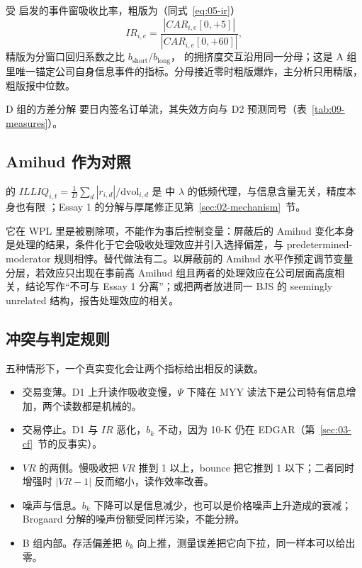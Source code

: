 \documentclass[a4paper,11pt]{ctexart}
\begin{document}
受 \citet{dellavignapollet2009} 启发的事件窗吸收比率，粗版为（同式~\eqref{eq:05-ir}）
\begin{equation}\label{eq:09-ir}
IR_{i,e} = \frac{|CAR_{i,e}[0,+5]|}{|CAR_{i,e}[0,+60]|},
\end{equation}
精版为分窗口回归系数之比 $b_{\text{short}}/b_{\text{long}}$，\citet{hirshleiferlimteoh2009} 的拥挤度交互沿用同一分母；这是 A 组里唯一锚定公司自身信息事件的指标。分母接近零时粗版爆炸，主分析只用精版，粗版报中位数。

D 组的方差分解 \citep{brogaardetal2022} 要日内签名订单流，其失效方向与 D2 预测同号（表~\ref{tab:09-measures}）。

\subsection{Amihud 作为对照}\label{sec:09-amihud}

\citet{amihud2002} 的 $ILLIQ_{i,t} = \frac{1}{D}\sum_d |r_{i,d}|/\text{dvol}_{i,d}$ 是 \citet{kyle1985} 中 $\lambda$ 的低频代理，与信息含量无关，精度本身也有限 \citep{goyenkoholdentrzcinka2009}；Essay 1 的分解与厚尾修正见第~\ref{sec:02-mechanism}~节。

它在 WPL 里是被剔除项，不能作为事后控制变量：屏蔽后的 Amihud 变化本身是处理的结果，条件化于它会吸收处理效应并引入选择偏差，与 predetermined-moderator 规则相悖。替代做法有二。以屏蔽前的 Amihud 水平作预定调节变量分层，若效应只出现在事前高 Amihud 组且两者的处理效应在公司层面高度相关，结论写作“不可与 Essay 1 分离”；或把两者放进同一 BJS 的 seemingly unrelated 结构，报告处理效应的相关。

\subsection{冲突与判定规则}\label{sec:09-conflicts}

五种情形下，一个真实变化会让两个指标给出相反的读数。

\begin{itemize}[leftmargin=2em, itemsep=2pt]
\item 交易变薄。D1 上升读作吸收变慢，$\Psi$ 下降在 MYY 读法下是公司特有信息增加，两个读数都是机械的。
\item 交易停止。D1 与 $IR$ 恶化，$b_k$ 不动，因为 10-K 仍在 EDGAR（第~\ref{sec:03-cf}~节的反事实）。
\item $VR$ 的两侧。慢吸收把 $VR$ 推到 1 以上，bounce 把它推到 1 以下；二者同时增强时 $|VR-1|$ 反而缩小，读作效率改善。
\item 噪声与信息。$b_k$ 下降可以是信息减少，也可以是价格噪声上升造成的衰减；Brogaard 分解的噪声份额受同样污染，不能分辨。
\item B 组内部。存活偏差把 $b_k$ 向上推，测量误差把它向下拉，同一样本可以给出零。
\end{itemize}
\end{document}
